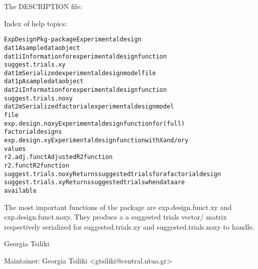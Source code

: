 \documentclass[letterpaper]{book}
\begin{document}
\begin{Details}\relax

The DESCRIPTION file:


Index of help topics:
\begin{alltt}
ExpDesignPkg-package    Experimental design
dat1                    A sample data object
dat1i                   Information for experimental design function
                        suggest.trials.xy
dat1m                   Serialized experimental design model file
dat1p                   A sample data object
dat2i                   Information for experimental design function
                        suggest.trials.noxy
dat2m                   Serialized factorial experimental design model
                        file
exp.design.noxy         Experimental design function for (full)
                        factorial designs
exp.design.xy           Experimental design function with X and/or y
                        values
r2.adj.funct            Adjusted R2 function
r2.funct                R2 function
suggest.trials.noxy     Returns suggested trials for a factorial design
suggest.trials.xy       Returns suggested trials when data are
                        available
\end{alltt}

The most important functions of the package are exp.design.funct.xy and exp.design.funct.noxy. They produce a a suggested trials vector/ matrix respectively serialized for suggested.trials.xy and suggested.trials.noxy to handle. 
\end{Details}
%
\begin{Author}\relax
Georgia Tsiliki

Maintainer: Georgia Tsiliki <gtsiliki@central.ntua.gr>
\end{Author}
\end{document}
